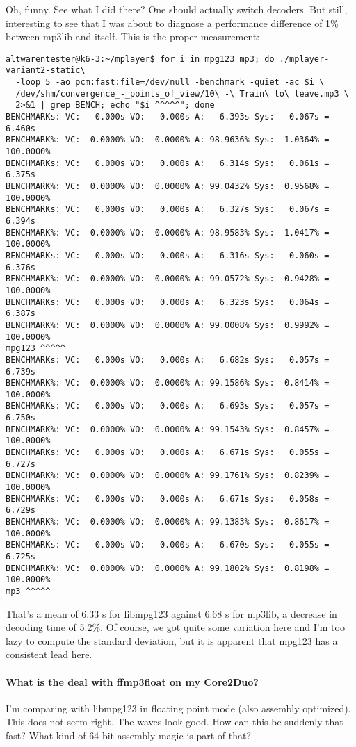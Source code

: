 \documentclass[a4paper,12pt]{scrartcl}
\begin{document}
Oh, funny. See what I did there? One should actually switch decoders. But still, interesting to see that I was about to diagnose a performance difference of 1\% between mp3lib and itself.
This is the proper measurement:
\begin{verbatim}
altwarentester@k6-3:~/mplayer$ for i in mpg123 mp3; do ./mplayer-variant2-static\
  -loop 5 -ao pcm:fast:file=/dev/null -benchmark -quiet -ac $i \
  /dev/shm/convergence_-_points_of_view/10\ -\ Train\ to\ leave.mp3 \
  2>&1 | grep BENCH; echo "$i ^^^^^"; done
BENCHMARKs: VC:   0.000s VO:   0.000s A:   6.393s Sys:   0.067s =    6.460s
BENCHMARK%: VC:  0.0000% VO:  0.0000% A: 98.9636% Sys:  1.0364% = 100.0000%
BENCHMARKs: VC:   0.000s VO:   0.000s A:   6.314s Sys:   0.061s =    6.375s
BENCHMARK%: VC:  0.0000% VO:  0.0000% A: 99.0432% Sys:  0.9568% = 100.0000%
BENCHMARKs: VC:   0.000s VO:   0.000s A:   6.327s Sys:   0.067s =    6.394s
BENCHMARK%: VC:  0.0000% VO:  0.0000% A: 98.9583% Sys:  1.0417% = 100.0000%
BENCHMARKs: VC:   0.000s VO:   0.000s A:   6.316s Sys:   0.060s =    6.376s
BENCHMARK%: VC:  0.0000% VO:  0.0000% A: 99.0572% Sys:  0.9428% = 100.0000%
BENCHMARKs: VC:   0.000s VO:   0.000s A:   6.323s Sys:   0.064s =    6.387s
BENCHMARK%: VC:  0.0000% VO:  0.0000% A: 99.0008% Sys:  0.9992% = 100.0000%
mpg123 ^^^^^
BENCHMARKs: VC:   0.000s VO:   0.000s A:   6.682s Sys:   0.057s =    6.739s
BENCHMARK%: VC:  0.0000% VO:  0.0000% A: 99.1586% Sys:  0.8414% = 100.0000%
BENCHMARKs: VC:   0.000s VO:   0.000s A:   6.693s Sys:   0.057s =    6.750s
BENCHMARK%: VC:  0.0000% VO:  0.0000% A: 99.1543% Sys:  0.8457% = 100.0000%
BENCHMARKs: VC:   0.000s VO:   0.000s A:   6.671s Sys:   0.055s =    6.727s
BENCHMARK%: VC:  0.0000% VO:  0.0000% A: 99.1761% Sys:  0.8239% = 100.0000%
BENCHMARKs: VC:   0.000s VO:   0.000s A:   6.671s Sys:   0.058s =    6.729s
BENCHMARK%: VC:  0.0000% VO:  0.0000% A: 99.1383% Sys:  0.8617% = 100.0000%
BENCHMARKs: VC:   0.000s VO:   0.000s A:   6.670s Sys:   0.055s =    6.725s
BENCHMARK%: VC:  0.0000% VO:  0.0000% A: 99.1802% Sys:  0.8198% = 100.0000%
mp3 ^^^^^
\end{verbatim}
That's a mean of 6.33 s for libmpg123 against 6.68 s for mp3lib, a decrease in decoding time of 5.2\%.
Of course, we got quite some variation here and I'm too lazy to compute the standard deviation, but it is apparent that mpg123 has a consistent lead here.

\paragraph{What is the deal with ffmp3float on my Core2Duo?}
I'm comparing with libmpg123 in floating point mode (also assembly optimized).
This does not seem right. The waves look good.
How can this be suddenly that fast? What kind of 64 bit assembly magic is part of that?
\end{document}
